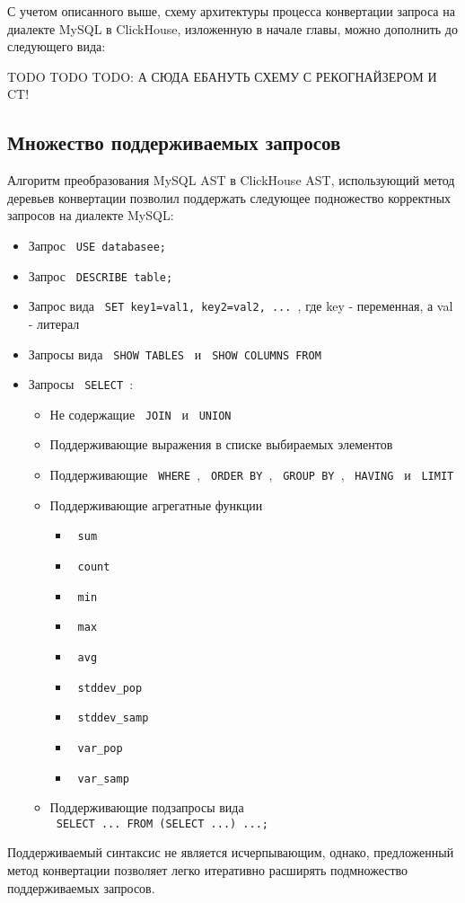 С учетом описанного выше, схему архитектуры процесса конвертации запроса на диалекте MySQL в ClickHouse, изложенную в начале главы, можно дополнить до следующего вида:

TODO TODO TODO: А СЮДА ЕБАНУТЬ СХЕМУ С РЕКОГНАЙЗЕРОМ И CT!

\subsection{Множество поддерживаемых запросов} \label{part:queries}
Алгоритм преобразования MySQL AST в ClickHouse AST, использующий метод деревьев конвертации позволил поддержать следующее подножество корректных запросов на диалекте MySQL:
\begin{itemize}
    \item Запрос \texttt{ USE databasee; }
    \item Запрос \texttt{ DESCRIBE table; }
    \item Запрос вида \texttt{ SET key1=val1, key2=val2, ... }, где key - переменная, а val - литерал
    \item Запросы вида \texttt{ SHOW TABLES } и \texttt{ SHOW COLUMNS FROM }
    \item Запросы \texttt{ SELECT }:
    \begin{itemize}
        \item Не содержащие \texttt{ JOIN } и \texttt{ UNION }
        \item Поддерживающие выражения в списке выбираемых элементов
        \item Поддерживающие \texttt{ WHERE }, \texttt{ ORDER BY }, \texttt{ GROUP BY }, \texttt{ HAVING } и \texttt{ LIMIT }
        \item Поддерживающие агрегатные функции 
        \begin{itemize}
            \item \texttt{ sum }
            \item \texttt{ count }
            \item \texttt{ min }
            \item \texttt{ max }
            \item \texttt{ avg }
            \item \texttt{ stddev_pop}
            \item \texttt{ stddev_samp }
            \item \texttt{ var_pop }
            \item \texttt{ var_samp }
        \end{itemize}
        \item Поддерживающие подзапросы вида \\ \texttt{ SELECT ... FROM (SELECT ...) ...; }
    \end{itemize}
\end{itemize}

Поддерживаемый синтаксис не является исчерпывающим, однако, предложенный метод конвертации позволяет легко итеративно расширять подмножество поддерживаемых запросов.

\pagebreak
